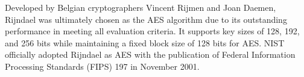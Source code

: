 Developed by Belgian cryptographers Vincent Rijmen and Joan Daemen, Rijndael was ultimately chosen as the AES algorithm due to its outstanding performance in meeting all evaluation criteria. 
It supports key sizes of 128, 192, and 256 bits while maintaining a fixed block size of 128 bits for AES. NIST officially adopted Rijndael as AES with the publication of 
Federal Information Processing Standards (FIPS) 197 in November 2001. 